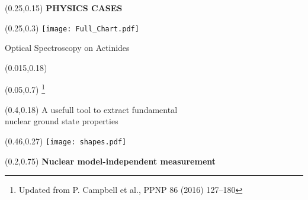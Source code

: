 \documentclass[10pt,aspectratio=169]{beamer}
\begin{document}
\begin{SectionTitle}
\begin{frame}
	\centering
	\begin{textblock*}{0.5\paperwidth}(0.25\paperwidth,0.15\paperheight)
		\centering
		\textbf{\LARGE PHYSICS CASES}	
	\end{textblock*}
	\begin{textblock*}{0.5\paperwidth}(0.25\paperwidth,0.3\paperheight)
        \texttt{[image: Full\_Chart.pdf]}
	\end{textblock*}

\end{frame}
\end{SectionTitle}

\begin{frame}{Optical Spectroscopy on Actinides}
	\begin{textblock*}{0.5\paperwidth}(0.015\paperwidth,0.18\paperheight)
		\begin{textblock*}{0.1\paperwidth}(0.05\paperwidth,0.7\paperheight)
			\footnote{Updated from P. Campbell et al., PPNP 86 (2016) 127–180}
		\end{textblock*}
	\end{textblock*}
	\begin{textblock*}{0.6\paperwidth}(0.4\paperwidth,0.18\paperheight)
		\centering
		A usefull tool to extract fundamental \\nuclear ground state properties
	\end{textblock*}
	\begin{textblock*}{0.3\paperwidth}(0.46\paperwidth,0.27\paperheight)
		\texttt{[image: shapes.pdf]}
	\end{textblock*}
	\begin{textblock*}{0.5\paperwidth}(0.2\paperwidth,0.75\paperheight)
		\textbf{Nuclear model-independent measurement} 
	\end{textblock*}
\end{frame}
\end{document}

